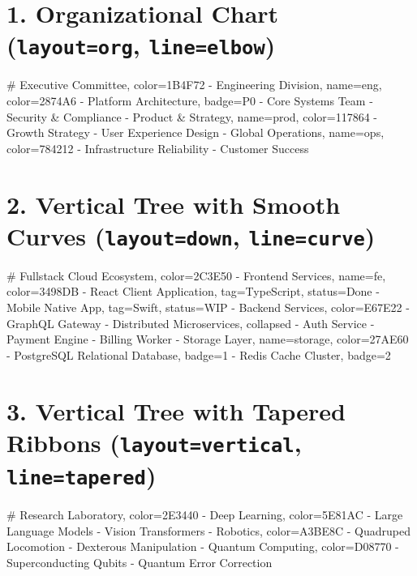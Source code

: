 \documentclass{article}
\begin{document}
\section*{1. Organizational Chart (\texttt{layout=org}, \texttt{line=elbow})}

\begin{center}
\begin{mindchart}[theme=business, layout=org, scale=0.78]
# Executive Committee, color=1B4F72
  - Engineering Division, name=eng, color=2874A6
    - Platform Architecture, badge=P0
    - Core Systems Team
    - Security \& Compliance
  - Product \& Strategy, name=prod, color=117864
    - Growth Strategy
    - User Experience Design
  - Global Operations, name=ops, color=784212
    - Infrastructure Reliability
    - Customer Success
\end{mindchart}
\end{center}

\newpage

\section*{2. Vertical Tree with Smooth Curves (\texttt{layout=down}, \texttt{line=curve})}

\begin{center}
\begin{mindchart}[theme=rainbow, layout=down, line=curve, scale=0.68]
# Fullstack Cloud Ecosystem, color=2C3E50
  - Frontend Services, name=fe, color=3498DB
    - React Client Application, tag=TypeScript, status=Done
    - Mobile Native App, tag=Swift, status=WIP
  - Backend Services, color=E67E22
    - GraphQL Gateway
    - Distributed Microservices, collapsed
      - Auth Service
      - Payment Engine
      - Billing Worker
  - Storage Layer, name=storage, color=27AE60
    - PostgreSQL Relational Database, badge=1
    - Redis Cache Cluster, badge=2
\end{mindchart}
\end{center}

\newpage

\section*{3. Vertical Tree with Tapered Ribbons (\texttt{layout=vertical}, \texttt{line=tapered})}

\begin{center}
\begin{mindchart}[theme=nord, layout=vertical, line=tapered, scale=0.85]
# Research Laboratory, color=2E3440
  - Deep Learning, color=5E81AC
    - Large Language Models
    - Vision Transformers
  - Robotics, color=A3BE8C
    - Quadruped Locomotion
    - Dexterous Manipulation
  - Quantum Computing, color=D08770
    - Superconducting Qubits
    - Quantum Error Correction
\end{mindchart}
\end{center}
\end{document}
